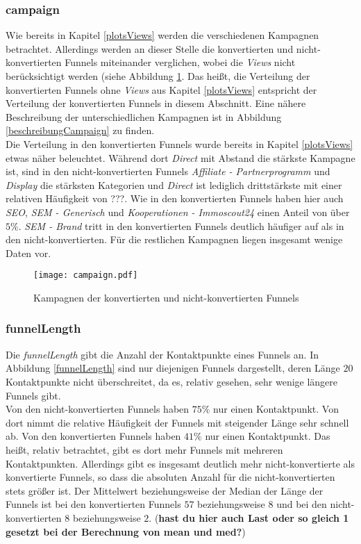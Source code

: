 \subsubsection*{campaign}
Wie bereits in Kapitel \ref{plotsViews} werden die verschiedenen Kampagnen betrachtet. Allerdings werden an dieser Stelle die konvertierten und nicht-konvertierten Funnels miteinander verglichen, wobei die \textit{Views} nicht berücksichtigt werden (siehe Abbildung \ref{campaign}. Das heißt, die Verteilung der konvertierten Funnels ohne \textit{Views} aus Kapitel \ref{plotsViews} entspricht der Verteilung der konvertierten Funnels in diesem Abschnitt. Eine nähere Beschreibung der unterschiedlichen Kampagnen ist in Abbildung \ref{beschreibungCampaign} zu finden.\\
Die Verteilung in den konvertierten Funnels wurde bereits in Kapitel \ref{plotsViews} etwas näher beleuchtet. Während dort \textit{Direct} mit Abstand die stärkste Kampagne ist, sind in den nicht-konvertierten Funnels \textit{Affiliate - Partnerprogramm} und \textit{Display} die stärksten Kategorien und \textit{Direct} ist lediglich drittstärkste mit einer relativen Häufigkeit von ???. Wie in den konvertierten Funnels haben hier auch \textit{SEO}, \textit{SEM - Generisch} und \textit{Kooperationen - Immoscout24} einen Anteil von über $5 \%$. \textit{SEM - Brand} tritt in den konvertierten Funnels deutlich häufiger auf als in den nicht-konvertierten. Für die restlichen Kampagnen liegen insgesamt wenige Daten vor.

\begin{figure}[H]
	\centering
	\texttt{[image: campaign.pdf]}
	\caption{Kampagnen der konvertierten und nicht-konvertierten Funnels}
	\label{campaign}
\end{figure}
    
\subsubsection*{funnelLength}
Die \textit{funnelLength} gibt die Anzahl der Kontaktpunkte eines Funnels an. In Abbildung \ref{funnelLength} sind nur diejenigen Funnels dargestellt, deren Länge $20$ Kontaktpunkte nicht überschreitet, da es, relativ gesehen, sehr wenige längere Funnels gibt.\\
Von den nicht-konvertierten Funnels haben $75 \%$ nur einen Kontaktpunkt. Von dort nimmt die relative Häufigkeit der Funnels mit steigender Länge sehr schnell ab. Von den konvertierten Funnels haben $41 \%$ nur einen Kontaktpunkt. Das heißt, relativ betrachtet, gibt es dort mehr Funnels mit mehreren Kontaktpunkten. Allerdings gibt es insgesamt deutlich mehr nicht-konvertierte als konvertierte Funnels, so dass die absoluten Anzahl für die nicht-konvertierten stets größer ist. Der Mittelwert beziehungsweise der Median der Länge der Funnels ist bei den konvertierten Funnels $57$ beziehungsweise $8$ und bei den nicht-konvertierten $8$ beziehungsweise $2$. (\textbf{hast du hier auch Last oder so gleich 1 gesetzt bei der Berechnung von mean und med?})

